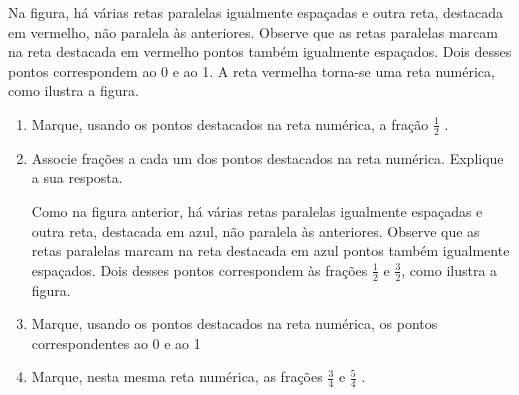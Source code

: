 Na figura, há várias retas paralelas igualmente espaçadas e outra reta, destacada em vermelho, não paralela às anteriores. Observe que as retas paralelas marcam na reta destacada em vermelho pontos também igualmente espaçados. Dois desses pontos correspondem ao 0 e ao 1. A reta vermelha torna-se uma reta numérica, como ilustra a figura. 

\begin{enumerate} [\quad a)] %
  \item     Marque, usando os pontos destacados na reta numérica, a fração     $\frac{1}{2}$    . 
  \item     Associe frações a cada um dos pontos destacados na reta numérica. Explique a sua resposta.    \mbox{} \newline      
\begin{center}
\end{center}

Como na figura anterior, há várias retas paralelas igualmente espaçadas e outra reta, destacada em azul, não paralela às anteriores. Observe que as retas paralelas marcam na reta destacada em azul pontos também igualmente espaçados. Dois desses pontos correspondem às frações $\frac{1}{2}$ e $\frac{3}{2}$, como ilustra a figura. 

  \item     Marque, usando os pontos destacados na reta numérica, os pontos correspondentes ao 0 e ao 1
  \item     Marque, nesta mesma reta numérica, as frações     $\frac{3}{4}$     e     $\frac{5}{4}$    .
\begin{center}
  \begin{tikzpicture}[x=56.25mm,y=56.25mm]
 

\end{tikzpicture}
\end{center}
\end{enumerate}
